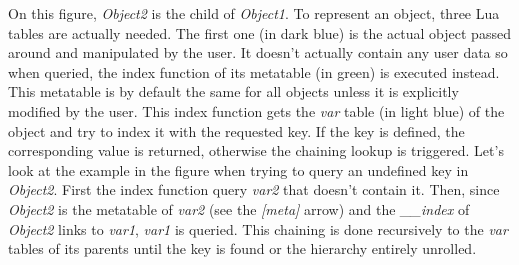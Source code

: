 On this figure, \emph{Object2} is the child of \emph{Object1}. To represent an
object, three Lua tables are actually needed. The first one (in dark blue) is
the actual object passed around and manipulated by the user. It doesn't actually
contain any user data so when queried, the index function of its metatable (in
green) is executed instead. This metatable is by default the same for all objects
unless it is explicitly modified by the user. This index function gets the
\emph{var} table (in light blue) of the object and try to index it with the
requested key. If the key is defined, the corresponding value is returned,
otherwise the chaining lookup is triggered. Let's look at the example in the
figure when trying to query an undefined key in \emph{Object2}.
First the index function query \emph{var2} that doesn't contain it. Then, since
\emph{Object2} is the metatable of \emph{var2} (see the \emph{[meta]} arrow) and
the \emph{\_\_index} of \emph{Object2} links to \emph{var1}, \emph{var1} is queried.
This chaining is done recursively to the \emph{var} tables of its parents until the
key is found or the hierarchy entirely unrolled.
